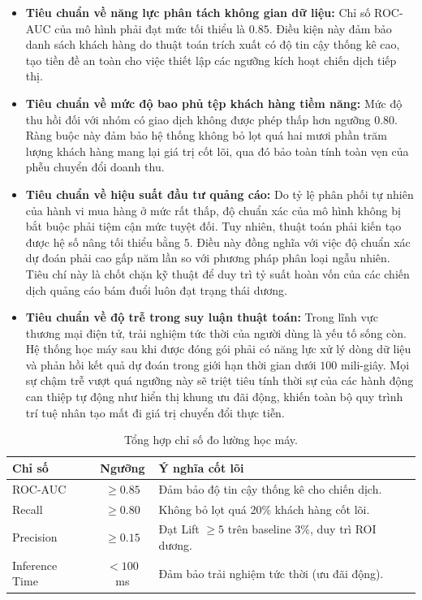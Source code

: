 \documentclass[a4paper,11pt]{article}
\begin{document}
\begin{itemize}
    \item \textbf{Tiêu chuẩn về năng lực phân tách không gian dữ liệu:} Chỉ số ROC-AUC của mô hình phải đạt mức tối thiểu là $0.85$. Điều kiện này đảm bảo danh sách khách hàng do thuật toán trích xuất có độ tin cậy thống kê cao, tạo tiền đề an toàn cho việc thiết lập các ngưỡng kích hoạt chiến dịch tiếp thị.
    
    \item \textbf{Tiêu chuẩn về mức độ bao phủ tệp khách hàng tiềm năng:} Mức độ thu hồi đối với nhóm có giao dịch không được phép thấp hơn ngưỡng $0.80$. Ràng buộc này đảm bảo hệ thống không bỏ lọt quá hai mươi phần trăm lượng khách hàng mang lại giá trị cốt lõi, qua đó bảo toàn tính toàn vẹn của phễu chuyển đổi doanh thu.
    
    \item \textbf{Tiêu chuẩn về hiệu suất đầu tư quảng cáo:} Do tỷ lệ phân phối tự nhiên của hành vi mua hàng ở mức rất thấp, độ chuẩn xác của mô hình không bị bắt buộc phải tiệm cận mức tuyệt đối. Tuy nhiên, thuật toán phải kiến tạo được hệ số nâng tối thiểu bằng $5$. Điều này đồng nghĩa với việc độ chuẩn xác dự đoán phải cao gấp năm lần so với phương pháp phân loại ngẫu nhiên. Tiêu chí này là chốt chặn kỹ thuật để duy trì tỷ suất hoàn vốn của các chiến dịch quảng cáo bám đuổi luôn đạt trạng thái dương.
    
    \item \textbf{Tiêu chuẩn về độ trễ trong suy luận thuật toán:} Trong lĩnh vực thương mại điện tử, trải nghiệm tức thời của người dùng là yếu tố sống còn. Hệ thống học máy sau khi được đóng gói phải có năng lực xử lý dòng dữ liệu và phản hồi kết quả dự đoán trong giới hạn thời gian dưới $100$ mili-giây. Mọi sự chậm trễ vượt quá ngưỡng này sẽ triệt tiêu tính thời sự của các hành động can thiệp tự động như hiển thị khung ưu đãi động, khiến toàn bộ quy trình trí tuệ nhân tạo mất đi giá trị chuyển đổi thực tiễn.
\end{itemize}
\begin{table}[h]
\centering
\small
\renewcommand{\arraystretch}{1.3}
\begin{tabular}{|l|c|p{7.5cm}|}
\hline
\textbf{Chỉ số} & \textbf{Ngưỡng} & \textbf{Ý nghĩa cốt lõi} \\ \hline
ROC-AUC & $\ge 0.85$ & Đảm bảo độ tin cậy thống kê cho chiến dịch. \\ \hline
Recall & $\ge 0.80$ & Không bỏ lọt quá 20\% khách hàng cốt lõi. \\ \hline
Precision & $\ge 0.15$ & Đạt Lift $\ge 5$ trên baseline 3\%, duy trì ROI dương. \\ \hline
Inference Time & $< 100$ ms & Đảm bảo trải nghiệm tức thời (ưu đãi động). \\ \hline
\end{tabular}
\caption{Tổng hợp chỉ số đo lường học máy.}
\end{table}
\end{document}
